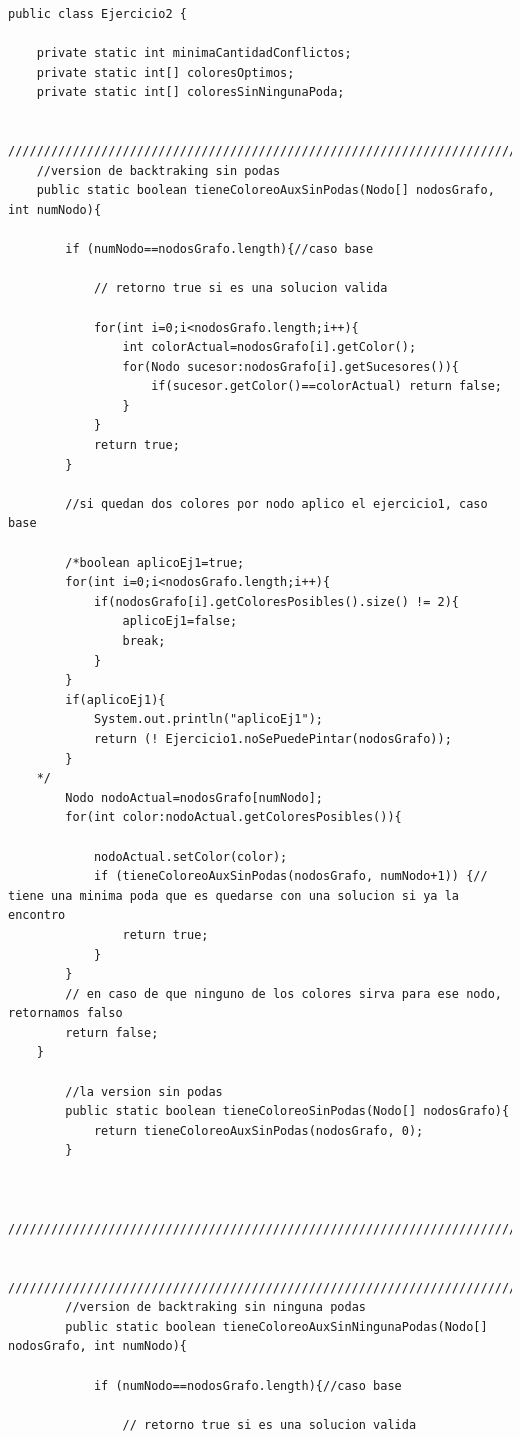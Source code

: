 \documentclass[a4paper]{article}
\begin{document}
\begin{lstlisting}
public class Ejercicio2 {
	
	private static int minimaCantidadConflictos;
	private static int[] coloresOptimos;
	private static int[] coloresSinNingunaPoda;

	//////////////////////////////////////////////////////////////////////////////////
	//version de backtraking sin podas
	public static boolean tieneColoreoAuxSinPodas(Nodo[] nodosGrafo, int numNodo){
		
		if (numNodo==nodosGrafo.length){//caso base
			
			// retorno true si es una solucion valida
			
			for(int i=0;i<nodosGrafo.length;i++){
				int colorActual=nodosGrafo[i].getColor();
				for(Nodo sucesor:nodosGrafo[i].getSucesores()){
					if(sucesor.getColor()==colorActual) return false;
				}
			}
			return true;
		}
		
		//si quedan dos colores por nodo aplico el ejercicio1, caso base
		
		/*boolean aplicoEj1=true;
		for(int i=0;i<nodosGrafo.length;i++){
			if(nodosGrafo[i].getColoresPosibles().size() != 2){
				aplicoEj1=false;
				break;
			}
		}
		if(aplicoEj1){
			System.out.println("aplicoEj1");
			return (! Ejercicio1.noSePuedePintar(nodosGrafo));
		}
	*/	
		Nodo nodoActual=nodosGrafo[numNodo]; 
		for(int color:nodoActual.getColoresPosibles()){
			
			nodoActual.setColor(color);	
			if (tieneColoreoAuxSinPodas(nodosGrafo, numNodo+1)) {// tiene una minima poda que es quedarse con una solucion si ya la encontro
				return true;			
			}
		}
		// en caso de que ninguno de los colores sirva para ese nodo, retornamos falso
		return false;
	}
	
		//la version sin podas
		public static boolean tieneColoreoSinPodas(Nodo[] nodosGrafo){
			return tieneColoreoAuxSinPodas(nodosGrafo, 0);
		}
	
	
	//////////////////////////////////////////////////////////////////////////////////////////////////////////////////
	
		//////////////////////////////////////////////////////////////////////////////////
		//version de backtraking sin ninguna podas
		public static boolean tieneColoreoAuxSinNingunaPodas(Nodo[] nodosGrafo, int numNodo){
			
			if (numNodo==nodosGrafo.length){//caso base
				
				// retorno true si es una solucion valida
				

\end{lstlisting}
\end{document}
